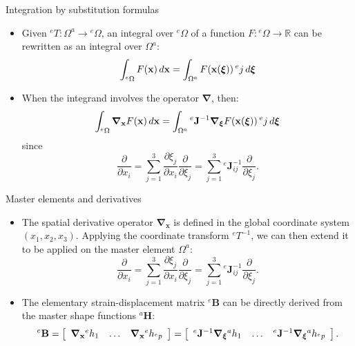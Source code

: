 \documentclass[aspectratio=169]{beamer}
\begin{document}
{

\begin{frame}{Integration by substitution formulas}
  \begin{itemize}
    \item Given \( {}^eT: \Omega^a \to {}^e\Omega \), an integral over \( {}^e\Omega \) of a function \( F: {}^e\Omega \to \mathbb{R} \) can be rewritten as an integral over \( \Omega^a \):
          \[
            \int_{{}^e\Omega} F(\mathbf{x}) \, d\mathbf x = \int_{\Omega^a} F(\mathbf{x}(\boldsymbol{\xi})) \, {}^e j \, d\boldsymbol\xi
          \]
    \item When the integrand involves the operator \( \boldsymbol{\nabla} \), then:
          \[
            \int_{{}^e\Omega} \boldsymbol{\nabla}_{\mathbf{x}} F(\mathbf{x}) \, d\mathbf x = \int_{\Omega^a} {}^e\mathbf{J}^{-1}\boldsymbol{\nabla}_{\boldsymbol{\xi}} F(\mathbf{x}(\boldsymbol{\xi}))  \, {}^e j \, d\boldsymbol\xi
          \]
          since
          \[
            \frac{\partial }{\partial x_i} = \sum_{j=1}^3 \frac{\partial \xi_j}{\partial x_i} \frac{\partial }{\partial \xi_j} =  \sum_{j=1}^3 {}^e\mathbf{J}_{ij}^{-1}\frac{\partial}{\partial \xi_j}.
          \]
  \end{itemize}
\end{frame}
}

\begin{frame}{Master elements and derivatives}
  \begin{itemize}
    \item The spatial derivative operator $\boldsymbol{\nabla}_{\mathbf x}$ is defined in the global coordinate system $(x_1, x_2, x_3)$. Applying the coordinate transform ${}^eT^{-1}$, we can then extend it to be applied on the master element $\Omega^a$:
          \[
            \frac{\partial }{\partial x_i} = \sum_{j=1}^3 \frac{\partial \xi_j}{\partial x_i} \frac{\partial }{\partial \xi_j} =  \sum_{j=1}^3 {}^e\mathbf{J}_{ij}^{-1}\frac{\partial}{\partial \xi_j}.
          \]
    \item The elementary strain-displacement matrix ${}^e\mathbf B$ can be directly derived from the master shape functions ${}^a\mathbf H$:
          \[
            {}^e\mathbf B =\left[\begin{array}{c;{2pt/2pt}c;{2pt/2pt}c}
                \boldsymbol{\nabla}_{\mathbf x} {}^eh_1 & \dots & \boldsymbol{\nabla}_{\mathbf x} {}^eh_{{}^ep}
              \end{array} \right]= \left[\begin{array}{c;{2pt/2pt}c;{2pt/2pt}c}
                {}^e\mathbf J^{-1}\boldsymbol{\nabla}_{\boldxi} {}^ah_1 & \dots & {}^e\mathbf J^{-1}\boldsymbol{\nabla}_{\boldxi} {}^ah_{{}^ep}
              \end{array} \right] .
          \]
  \end{itemize}
\end{frame}
\end{document}
